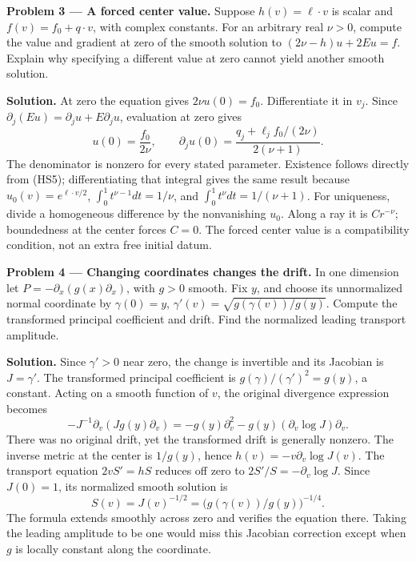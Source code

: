 \documentclass[
  11pt,
]{article}
\begin{document}
\textbf{Problem 3 --- A forced center value.} Suppose
\(h(v)=\ell\cdot v\) is scalar and \(f(v)=f_0+q\cdot v\), with complex
constants. For an arbitrary real \(\nu>0\), compute the value and
gradient at zero of the smooth solution to \((2\nu-h)u+2Eu=f\). Explain
why specifying a different value at zero cannot yield another smooth
solution.

\textbf{Solution.} At zero the equation gives \(2\nu u(0)=f_0\).
Differentiate it in \(v_j\). Since
\(\partial_j(Eu)=\partial_ju+E\partial_ju\), evaluation at zero gives \[
 u(0)=\frac{f_0}{2\nu},\qquad
 \partial_ju(0)=\frac{q_j+\ell_j f_0/(2\nu)}{2(\nu+1)}.       \tag{HP3}
\] The denominator is nonzero for every stated parameter. Existence
follows directly from (HS5); differentiating that integral gives the
same result because \(u_0(v)=e^{\ell\cdot v/2}\),
\(\int_0^1t^{\nu-1}dt=1/\nu\), and \(\int_0^1t^\nu dt=1/(\nu+1)\). For
uniqueness, divide a homogeneous difference by the nonvanishing \(u_0\).
Along a ray it is \(Cr^{-\nu}\); boundedness at the center forces
\(C=0\). The forced center value is a compatibility condition, not an
extra free initial datum.

\textbf{Problem 4 --- Changing coordinates changes the drift.} In one
dimension let \(P=-\partial_x(g(x)\partial_x)\), with \(g>0\) smooth.
Fix \(y\), and choose its unnormalized normal coordinate by
\(\gamma(0)=y\), \(\gamma'(v)=\sqrt{g(\gamma(v))/g(y)}\). Compute the
transformed principal coefficient and drift. Find the normalized leading
transport amplitude.

\textbf{Solution.} Since \(\gamma'>0\) near zero, the change is
invertible and its Jacobian is \(J=\gamma'\). The transformed principal
coefficient is \(g(\gamma)/(\gamma')^2=g(y)\), a constant. Acting on a
smooth function of \(v\), the original divergence expression becomes \[
       -J^{-1}\partial_v(Jg(y)\partial_v)
          =-g(y)\partial_v^2-g(y)(\partial_v\log J)\partial_v.
                                                               \tag{HP4}
\] There was no original drift, yet the transformed drift is generally
nonzero. The inverse metric at the center is \(1/g(y)\), hence
\(h(v)=-v\partial_v\log J(v)\). The transport equation \(2vS'=hS\)
reduces off zero to \(2S'/S=-\partial_v\log J\). Since \(J(0)=1\), its
normalized smooth solution is \[
                    S(v)=J(v)^{-1/2}
                         =\bigl(g(\gamma(v))/g(y)\bigr)^{-1/4}.
                                                               \tag{HP5}
\] The formula extends smoothly across zero and verifies the equation
there. Taking the leading amplitude to be one would miss this Jacobian
correction except when \(g\) is locally constant along the coordinate.
\end{document}

